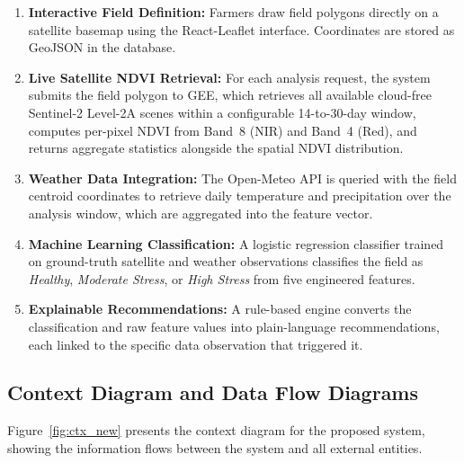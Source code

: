 \documentclass[12pt,a4paper]{report}
\begin{document}
\begin{enumerate}
  \item \textbf{Interactive Field Definition:} Farmers draw field polygons directly on a satellite basemap using the React-Leaflet interface. Coordinates are stored as GeoJSON in the database.

  \item \textbf{Live Satellite NDVI Retrieval:} For each analysis request, the system submits the field polygon to GEE, which retrieves all available cloud-free Sentinel-2 Level-2A scenes within a configurable 14-to-30-day window, computes per-pixel NDVI from Band~8 (NIR) and Band~4 (Red), and returns aggregate statistics alongside the spatial NDVI distribution.

  \item \textbf{Weather Data Integration:} The Open-Meteo API is queried with the field centroid coordinates to retrieve daily temperature and precipitation over the analysis window, which are aggregated into the feature vector.

  \item \textbf{Machine Learning Classification:} A logistic regression classifier trained on ground-truth satellite and weather observations classifies the field as \emph{Healthy}, \emph{Moderate Stress}, or \emph{High Stress} from five engineered features.

  \item \textbf{Explainable Recommendations:} A rule-based engine converts the classification and raw feature values into plain-language recommendations, each linked to the specific data observation that triggered it.
\end{enumerate}

\subsection{Context Diagram and Data Flow Diagrams}

Figure~\ref{fig:ctx_new} presents the context diagram for the proposed system, showing the information flows between the system and all external entities.
\end{document}
